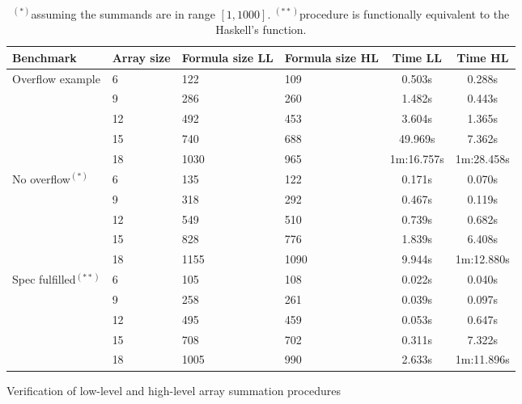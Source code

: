 \begin{table*}[t]
\vspace{-1mm}
\smaller
\centering
\begin{tabular}{l||l|l|l|c|c}
\hline
Benchmark           & Array size & Formula size LL & Formula size HL & Time LL    & Time HL    \\\hline
Overflow example    & 6          & 122             & 109             & 0.503s     & 0.288s     \\
                    & 9          & 286             & 260             & 1.482s     & 0.443s     \\
                    & 12         & 492             & 453             & 3.604s     & 1.365s     \\
                    & 15         & 740             & 688             & 49.969s    & 7.362s     \\
                    & 18         & 1030            & 965             & 1m:16.757s & 1m:28.458s \\\hline\hline
No overflow$^{(*)}$ & 6          & 135             & 122             & 0.171s     & 0.070s     \\
                    & 9          & 318             & 292             & 0.467s     & 0.119s     \\
                    & 12         & 549             & 510             & 0.739s     & 0.682s     \\
                    & 15         & 828             & 776             & 1.839s     & 6.408s     \\
                    & 18         & 1155            & 1090            & 9.944s     & 1m:12.880s \\\hline
\hline
Spec fulfilled$^{(**)}$ & 6          & 105             & 108            & 0.022s     & 0.040s     \\
                        & 9          & 258             & 261            & 0.039s     & 0.097s     \\
                        & 12         & 495             & 459            & 0.053s     & 0.647s     \\
                        & 15         & 708             & 702            & 0.311s     & 7.322s     \\
                        & 18         & 1005            & 990            & 2.633s     & 1m:11.896s \\\hline
\end{tabular}
\caption{Verification of low-level and high-level array summation procedures
\label{tab-sum-benchmark}}
\caption*{\\$^{(*)}$assuming the summands are in range $[1, 1000]$.
$^{(**)}$procedure is functionally equivalent to the Haskell's  function.}
\vspace{-8mm}
\end{table*}


